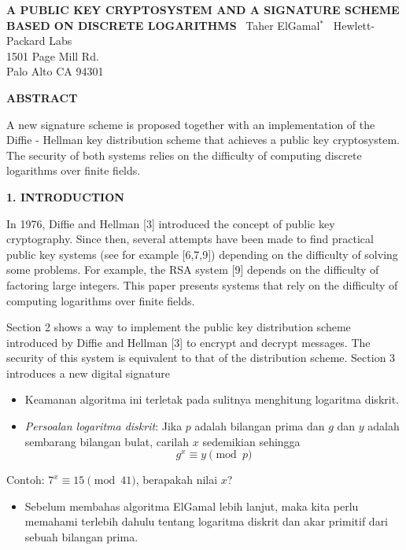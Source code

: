 \documentclass{article}
\begin{document}
\newpage


\begin{center}
\textbf{A PUBLIC KEY CRYPTOSYSTEM AND A SIGNATURE SCHEME BASED ON DISCRETE LOGARITHMS}\
\vspace{1em}
Taher ElGamal$^*$\
\vspace{1em}
Hewlett-Packard Labs\\
1501 Page Mill Rd.\\
Palo Alto CA 94301
\end{center}

\textbf{ABSTRACT}

A new signature scheme is proposed together with an implementation of the Diffie - Hellman key distribution scheme that achieves a public key cryptosystem. The security of both systems relies on the difficulty of computing discrete logarithms over finite fields.

\textbf{1. INTRODUCTION}

In 1976, Diffie and Hellman [3] introduced the concept of public key cryptography. Since then, several attempts have been made to find practical public key systems (see for example [6,7,9]) depending on the difficulty of solving some problems. For example, the RSA system [9] depends on the difficulty of factoring large integers. This paper presents systems that rely on the difficulty of computing logarithms over finite fields.

Section 2 shows a way to implement the public key distribution scheme introduced by Diffie and Hellman [3] to encrypt and decrypt messages. The security of this system is equivalent to that of the distribution scheme. Section 3 introduces a new digital signature

\newpage


\begin{itemize}
    \item Keamanan algoritma ini terletak pada sulitnya menghitung logaritma diskrit.
    \item \textit{Persoalan logaritma diskrit}: Jika $p$ adalah bilangan prima dan $g$ dan $y$ adalah sembarang bilangan bulat, carilah $x$ sedemikian sehingga
    \[ g^x \equiv y \pmod{p} \]
\end{itemize}

Contoh: $7^x \equiv 15 \pmod{41}$, berapakah nilai $x$?

\begin{itemize}
    \item Sebelum membahas algoritma ElGamal lebih lanjut, maka kita perlu memahami terlebih dahulu tentang logaritma diskrit dan akar primitif dari sebuah bilangan prima.
\end{itemize}
\end{document}
